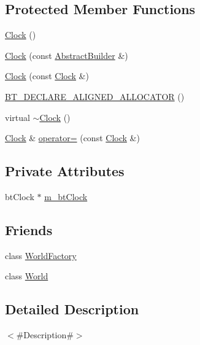 \subsection*{Protected Member Functions}
\begin{DoxyCompactItemize}
\item 
\mbox{\hyperlink{classnjli_1_1_clock_a46fe51eb140fd7a3e6a011d511a7263f}{Clock}} ()
\item 
\mbox{\hyperlink{classnjli_1_1_clock_a7e5e8e455e01fc4deb3174770a9a3532}{Clock}} (const \mbox{\hyperlink{classnjli_1_1_abstract_builder}{Abstract\+Builder}} \&)
\item 
\mbox{\hyperlink{classnjli_1_1_clock_a25793091ce80c61997437fb69efedb50}{Clock}} (const \mbox{\hyperlink{classnjli_1_1_clock}{Clock}} \&)
\item 
\mbox{\hyperlink{classnjli_1_1_clock_a8223b146693fd33eaeeb13ff476dd2de}{B\+T\+\_\+\+D\+E\+C\+L\+A\+R\+E\+\_\+\+A\+L\+I\+G\+N\+E\+D\+\_\+\+A\+L\+L\+O\+C\+A\+T\+OR}} ()
\item 
virtual \mbox{\hyperlink{classnjli_1_1_clock_aeefd3c72d70056958b87e689b3372744}{$\sim$\+Clock}} ()
\item 
\mbox{\hyperlink{classnjli_1_1_clock}{Clock}} \& \mbox{\hyperlink{classnjli_1_1_clock_a5b62f508f07e979fe392a8fd099819fd}{operator=}} (const \mbox{\hyperlink{classnjli_1_1_clock}{Clock}} \&)
\end{DoxyCompactItemize}
\subsection*{Private Attributes}
\begin{DoxyCompactItemize}
\item 
bt\+Clock $\ast$ \mbox{\hyperlink{classnjli_1_1_clock_ab107f00a19c387d5b34d4a2fb92d8370}{m\+\_\+bt\+Clock}}
\end{DoxyCompactItemize}
\subsection*{Friends}
\begin{DoxyCompactItemize}
\item 
class \mbox{\hyperlink{classnjli_1_1_clock_acb96ebb09abe8f2a37a915a842babfac}{World\+Factory}}
\item 
class \mbox{\hyperlink{classnjli_1_1_clock_a7b4bcdf992c21ae83363f25df05b1d25}{World}}
\end{DoxyCompactItemize}


\subsection{Detailed Description}
$<$\#\+Description\#$>$ 

